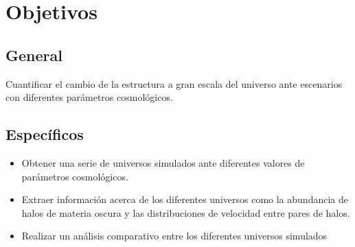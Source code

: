 \section{Objetivos}

\subsection*{General}
Cuantificar el cambio de la estructura a gran escala del universo ante escenarios con diferentes parámetros cosmológicos.
\subsection*{Específicos}
\begin{itemize}
	\item Obtener una serie de universos simulados ante diferentes valores de parámetros cosmológicos.
	\item Extraer información acerca de los diferentes universos como la abundancia de halos de materia oscura y las distribuciones de velocidad entre pares de halos.
	\item Realizar un análisis comparativo entre los diferentes universos simulados
\end{itemize}